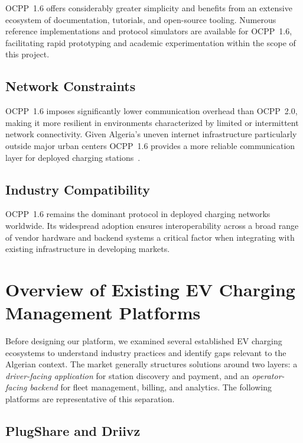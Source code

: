 \documentclass[12pt,a4paper]{report}
\begin{document}
OCPP~1.6 offers considerably greater simplicity and benefits from an extensive ecosystem of
documentation, tutorials, and open-source tooling. Numerous reference implementations and
protocol simulators are available for OCPP~1.6, facilitating rapid prototyping and academic
experimentation within the scope of this project.

\subsection{Network Constraints}

OCPP~1.6 imposes significantly lower communication overhead than OCPP~2.0, making it more
resilient in environments characterized by limited or intermittent network connectivity. Given
Algeria's uneven internet infrastructure particularly outside major urban centers OCPP~1.6
provides a more reliable communication layer for deployed charging stations~\autocite{ampcontrol2024}.

\subsection{Industry Compatibility}

OCPP~1.6 remains the dominant protocol in deployed charging networks worldwide. Its widespread
adoption ensures interoperability across a broad range of vendor hardware and backend systems
a critical factor when integrating with existing infrastructure in developing markets.

\section{Overview of Existing EV Charging Management Platforms}

Before designing our platform, we examined several established EV charging ecosystems
to understand industry practices and identify gaps relevant to the Algerian context.
The market generally structures solutions around two layers: a \textit{driver-facing
application} for station discovery and payment, and an \textit{operator-facing backend}
for fleet management, billing, and analytics. The following platforms are representative
of this separation.

\subsection{PlugShare and Driivz}
\end{document}
